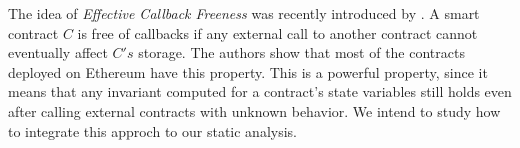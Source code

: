 The idea of \emph{Effective Callback Freeness} was recently introduced by
\cite{Grossman}.
%
A smart contract $C$ is free of callbacks if any external call to another
contract cannot eventually affect $C's$ storage.
%
The authors show that most of the contracts deployed on Ethereum have this
property.
%
This is a powerful property, since it means that any invariant computed for a
contract's state variables still holds even after calling external contracts
with unknown behavior.
%
We intend to study how to integrate this approch to our static analysis.
